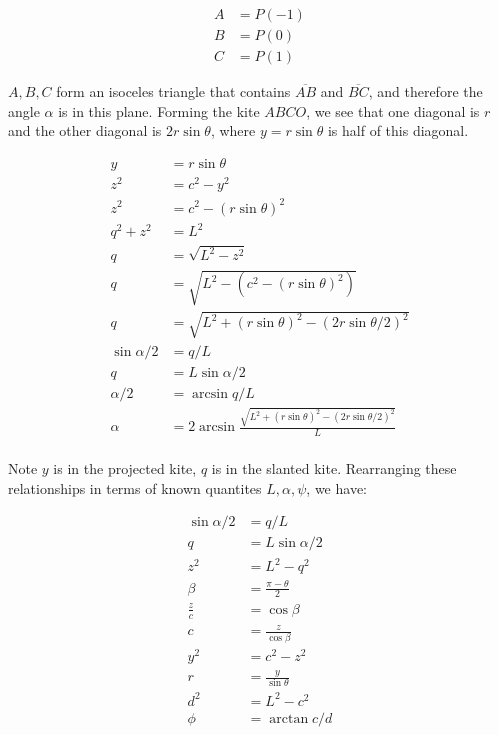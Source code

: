 \documentclass[11pt]{article}
\begin{document}
\begin{align*}
    A &= P(-1)  \\
    B &= P(0) \\
    C &= P(1)
\end{align*}

$A,B,C$ form an isoceles triangle that contains $\overline{AB}$ and $\overline{BC}$, and therefore the angle $\alpha$ is in
this plane. Forming the kite $ABCO$, we see that one diagonal is $r$ and the other diagonal is $2 r \sin{\theta}$, where
$y = r \sin{\theta}$ is half of this diagonal. 

\begin{align*}
    y &= r \sin{\theta}  \\
    z^2 &= c^2 - y^2 \\
    z^2 &= c^2 - (r \sin{\theta})^2 \\    
    q^2 + z^2 &= L^2 \\
    q &= \sqrt{L^2 - z^2} \\
    q &= \sqrt{L^2 - (c^2- (r\sin{\theta})^2)} \\
    q &= \sqrt{L^2 + (r\sin{\theta})^2 - (2r\sin{\theta/2})^2 } \\        
    \sin{\alpha/2} &= q/L \\
    q &= L \sin{\alpha/2} \\
    \alpha/2 &= \arcsin{q/L} \\
    \alpha &= 2 \arcsin{\frac{\sqrt{L^2 + (r\sin{\theta})^2 -
          (2r\sin{\theta/2})^2}}
      {L}} \\ 
\end{align*}

Note $y$ is in the projected kite, $q$ is in the slanted kite.
Rearranging these relationships in terms of known quantites $L, \alpha, \psi$, we have:

\begin{align*}
  \sin{\alpha/2} &= q/L \\
  q &= L \sin{\alpha/2} \\    
  z^2 &= L^2 - q^2 \\
  \beta &= \frac{\pi - \theta}{2} \\
  \frac{z}{c} &= \cos{\beta} \\
  c &= \frac{z}{\cos{\beta}} \\
  y^2 &= c^2 - z^2 \\
  r &= \frac{y}{\sin{\theta}} \\
  d^2 &= L^2 - c^2 \\
  \phi &= \arctan{c/d} \\
\end{align*}
\end{document}
